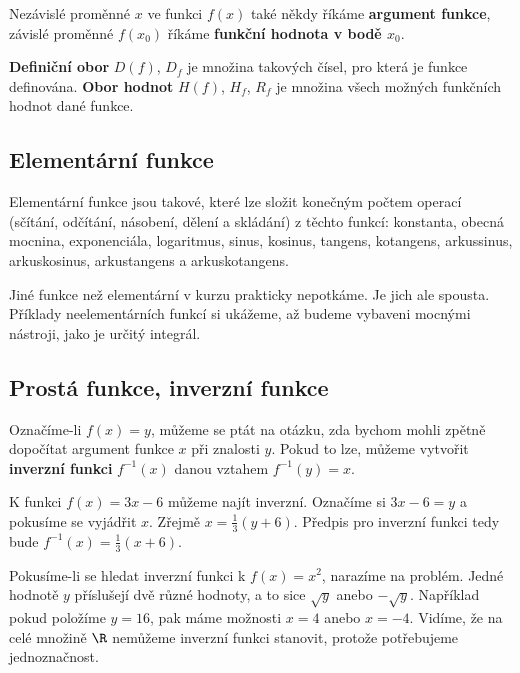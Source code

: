 Nezávislé proměnné $x$ ve funkci $f(x)$ také někdy říkáme \textbf{argument funkce}, závislé proměnné $f(x_0)$ říkáme \textbf{funkční hodnota v bodě $x_0$}.


\textbf{Definiční obor} $D(f)$, $D_f$ je množina takových čísel, pro která je funkce definována. \textbf{Obor hodnot} $H(f)$, $H_f$, $R_f$ je množina všech možných funkčních hodnot dané funkce. 

\subsection*{Elementární funkce}

Elementární funkce jsou takové, které lze složit konečným počtem operací (sčítání, odčítání, násobení, dělení a skládání) z těchto funkcí: konstanta, obecná mocnina, exponenciála, logaritmus, sinus, kosinus, tangens, kotangens, arkussinus, arkuskosinus, arkustangens a arkuskotangens. 

Jiné funkce než elementární v kurzu prakticky nepotkáme. Je jich ale spousta. Příklady neelementárních funkcí si ukážeme, až budeme vybaveni mocnými nástroji, jako je určitý integrál.

\subsection*{Prostá funkce, inverzní funkce}

Označíme-li $f(x) = y$, můžeme se ptát na otázku, zda bychom mohli zpětně dopočítat argument funkce $x$ při znalosti $y$. Pokud to lze, můžeme vytvořit \textbf{inverzní funkci} $f^{-1}(x)$ danou vztahem $f^{-1}(y) = x$.

\begin{example}
    K funkci $f(x) = 3x-6$ můžeme najít inverzní. Označíme si $3x-6=y$ a pokusíme se vyjádřit $x$. Zřejmě $x = \frac{1}{3}(y+6)$. Předpis pro inverzní funkci tedy bude $f^{-1}(x) = \frac{1}{3} (x+6)$.
\end{example}

\begin{example}
    Pokusíme-li se hledat inverzní funkci k $f(x) = x^2$, narazíme na problém. Jedné hodnotě $y$ příslušejí dvě různé hodnoty, a to sice $\sqrt{y}$ anebo $-\sqrt{y}$. Například pokud položíme $y = 16$, pak máme možnosti $x=4$ anebo $x=-4$. Vidíme, že na celé množině $\R$ nemůžeme inverzní funkci stanovit, protože potřebujeme jednoznačnost.
\end{example}

